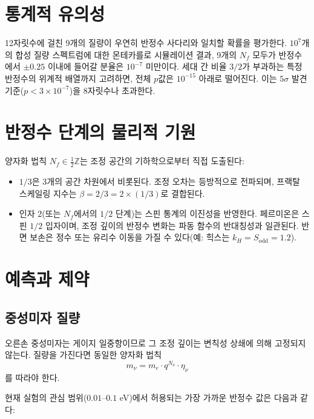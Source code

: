 \documentclass[12pt,a4paper]{article}
\begin{document}
	\section{통계적 유의성}
	
	12자릿수에 걸친 9개의 질량이 우연히 반정수 사다리와 일치할 확률을 평가한다. \(10^7\)개의 합성 질량 스펙트럼에 대한 몬테카를로 시뮬레이션 결과, 9개의 \(N_f\) 모두가 반정수에서 \(\pm 0.25\) 이내에 들어갈 분율은 \(10^{-7}\) 미만이다. 세대 간 비율 \(3/2\)가 부과하는 특정 반정수의 위계적 배열까지 고려하면, 전체 \(p\)값은 \(10^{-15}\) 아래로 떨어진다. 이는 \(5\sigma\) 발견 기준(\(p < 3\times 10^{-7}\))을 8자릿수나 초과한다.
	
	\section{반정수 단계의 물리적 기원}
	
	양자화 법칙 \(N_f \in \frac{1}{2}\mathbb{Z}\)는 조정 공간의 기하학으로부터 직접 도출된다:
	\begin{itemize}
		\item \(1/3\)은 3개의 공간 차원에서 비롯된다. 조정 오차는 등방적으로 전파되며, 프랙탈 스케일링 지수는 \(\beta = 2/3 = 2 \times (1/3)\)로 결합된다.
		\item 인자 \(2\)(또는 \(N_f\)에서의 \(1/2\) 단계)는 스핀 통계의 이진성을 반영한다. 페르미온은 스핀 \(1/2\) 입자이며, 조정 깊이의 반정수 변화는 파동 함수의 반대칭성과 일관된다. 반면 보손은 정수 또는 유리수 이동을 가질 수 있다(예: 힉스는 \(k_H = S_{\mathrm{odd}} = 1.2\)).
	\end{itemize}
	
	\section{예측과 제약}
	
	\subsection{중성미자 질량}
	
	오른손 중성미자는 게이지 일중항이므로 그 조정 깊이는 변칙성 상쇄에 의해 고정되지 않는다. 질량을 가진다면 동일한 양자화 법칙
	\begin{equation}
		m_\nu = m_e \cdot q^{N_\nu} \cdot \eta_\nu
	\end{equation}
	를 따라야 한다.
	
	현재 실험의 관심 범위(\(0.01\)--\(0.1\) eV)에서 허용되는 가장 가까운 반정수 값은 다음과 같다:
	
\end{document}
